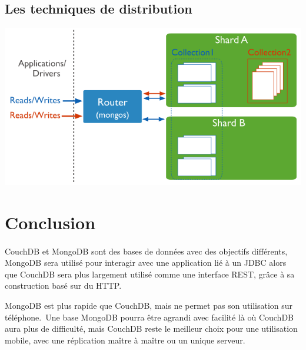 \documentclass{article}
\begin{document}
\subsection{Les techniques de distribution}
  \includegraphics[scale=0.7]{mongodb/sharded-mongodb.png}\\

\newpage
\section{Conclusion}
  \paragraph{}
  CouchDB et MongoDB sont des bases de données avec des objectifs différents,
  MongoDB sera utilisé pour interagir avec une application lié à un JDBC alors que CouchDB sera plus largement utilisé
  comme une interface REST, grâce à sa construction basé sur du HTTP.\
  
  MongoDB est plus rapide que CouchDB, mais ne permet pas son utilisation sur téléphone.\
  Une base MongoDB pourra être agrandi avec facilité là où CouchDB aura plus de difficulté, mais CouchDB reste le meilleur choix pour une utilisation mobile, avec une réplication maître à maître ou un unique serveur.
  
\end{document}
